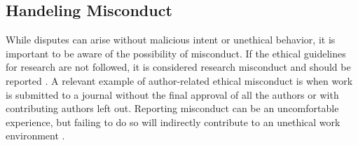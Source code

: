 \subsection{Handeling Misconduct}
While disputes can arise without malicious intent or unethical behavior, it is important to be aware of the possibility of misconduct.
If the ethical guidelines for research are not followed, it is considered research misconduct and should be reported \cite{albertHowHandleAuthorship2003}.
A relevant example of author-related ethical misconduct is when work is submitted to a journal without the final approval of all the authors or with contributing authors left out.
Reporting misconduct can be an uncomfortable experience, but failing to do so will indirectly contribute to an unethical work environment \cite{albertHowHandleAuthorship2003}.






